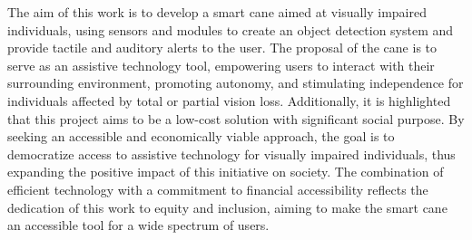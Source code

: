 The aim of this work is to develop a smart cane aimed at visually impaired individuals, using sensors and modules to create an object detection system and provide tactile and auditory alerts to the user. The proposal of the cane is to serve as an assistive technology tool, empowering users to interact with their surrounding environment, promoting autonomy, and stimulating independence for individuals affected by total or partial vision loss. Additionally, it is highlighted that this project aims to be a low-cost solution with significant social purpose. By seeking an accessible and economically viable approach, the goal is to democratize access to assistive technology for visually impaired individuals, thus expanding the positive impact of this initiative on society. The combination of efficient technology with a commitment to financial accessibility reflects the dedication of this work to equity and inclusion, aiming to make the smart cane an accessible tool for a wide spectrum of users.

